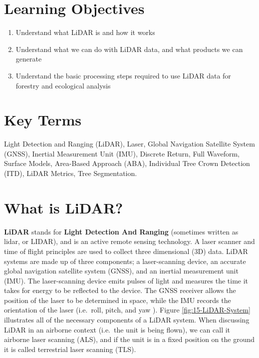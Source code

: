 \documentclass[
]{book}
\providecommand{\tightlist}{%
  \setlength{\itemsep}{0pt}\setlength{\parskip}{0pt}}
\begin{document}
\section*{Learning Objectives}\label{learning-objectives-12}

\begin{enumerate}
\def\labelenumi{\arabic{enumi}.}
\tightlist
\item
  Understand what LiDAR is and how it works
\item
  Understand what we can do with LiDAR data, and what products we can generate
\item
  Understand the basic processing steps required to use LiDAR data for forestry and ecological analysis
\end{enumerate}

\section*{Key Terms}\label{key-terms-12}

Light Detection and Ranging (LiDAR), Laser, Global Navigation Satellite System (GNSS), Inertial Measurement Unit (IMU), Discrete Return, Full Waveform, Surface Models, Area-Based Approach (ABA), Individual Tree Crown Detection (ITD), LiDAR Metrics, Tree Segmentation.

\section{What is LiDAR?}\label{what-is-lidar}

\textbf{LiDAR} stands for \textbf{Light Detection And Ranging} (sometimes written as lidar, or LIDAR), and is an active remote sensing technology. A laser scanner and time of flight principles are used to collect three dimensional (3D) data. LiDAR systems are made up of three components; a laser-scanning device, an accurate global navigation satellite system (GNSS), and an inertial measurement unit (IMU). The laser-scanning device emits pulses of light and measures the time it takes for energy to be reflected to the device. The GNSS receiver allows the position of the laser to be determined in space, while the IMU records the orientation of the laser (i.e.~roll, pitch, and yaw \citep{white_best_2013}). Figure \ref{fig:15-LiDAR-System} illustrates all of the necessary components of a LiDAR system. When discussing LiDAR in an airborne context (i.e.~the unit is being flown), we can call it airborne laser scanning (ALS), and if the unit is in a fixed position on the ground it is called terrestrial laser scanning (TLS).
\end{document}
